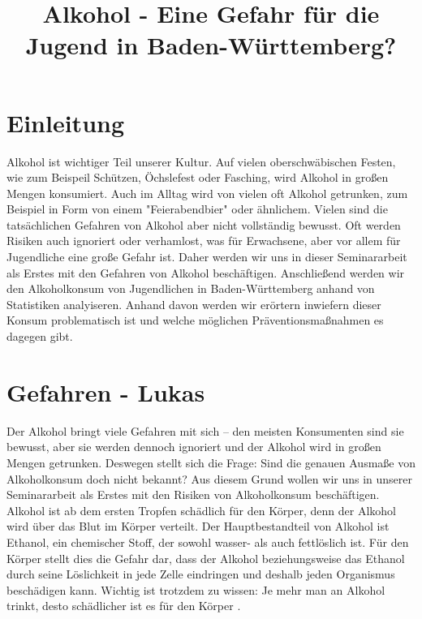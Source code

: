 \documentclass[12pt]{article}
\title{Alkohol - Eine Gefahr für die Jugend in Baden-Württemberg?}
\begin{document}


\clearpage
\tableofcontents
\clearpage
{}
\section{Einleitung}
Alkohol ist wichtiger Teil unserer Kultur. Auf vielen oberschwäbischen Festen, wie zum Beispeil Schützen, Öchslefest oder Fasching, wird Alkohol in großen Mengen konsumiert. Auch im Alltag wird von vielen oft Alkohol getrunken, zum Beispiel in Form von einem "Feierabendbier" oder ähnlichem. Vielen sind die tatsächlichen Gefahren von Alkohol aber nicht vollständig bewusst. Oft werden Risiken auch ignoriert oder verhamlost, was für Erwachsene, aber vor allem für Jugendliche eine große Gefahr ist. Daher werden wir uns in dieser Seminararbeit als Erstes mit den Gefahren von Alkohol beschäftigen. Anschließend werden wir den Alkoholkonsum von Jugendlichen in Baden-Württemberg anhand von Statistiken analyiseren. Anhand davon werden wir erörtern inwiefern dieser Konsum problematisch ist und welche möglichen Präventionsmaßnahmen es dagegen gibt.
\section{Gefahren \footnotesize{- Lukas}} %
Der Alkohol bringt viele Gefahren mit sich – den meisten Konsumenten sind sie bewusst, aber sie werden dennoch ignoriert und der Alkohol wird in großen Mengen getrunken. 
Deswegen stellt sich die Frage: Sind die genauen Ausmaße von Alkoholkonsum doch nicht bekannt? 
Aus diesem Grund wollen wir uns in unserer Seminararbeit als Erstes mit den Risiken von Alkoholkonsum beschäftigen.%
Alkohol ist ab dem ersten Tropfen schädlich für den Körper, denn der Alkohol wird über das Blut im Körper verteilt. Der Hauptbestandteil von Alkohol ist Ethanol, ein chemischer Stoff, der sowohl wasser- als auch fettlöslich ist. Für den Körper stellt dies die Gefahr dar, dass der Alkohol beziehungsweise das Ethanol durch seine Löslichkeit in jede Zelle eindringen und deshalb jeden Organismus beschädigen kann. Wichtig ist trotzdem zu wissen: Je mehr man an Alkohol trinkt, desto schädlicher ist es für den Körper \autocite{burger_bundes-gesundheitssurvey_2003}.\\
\end{document}
